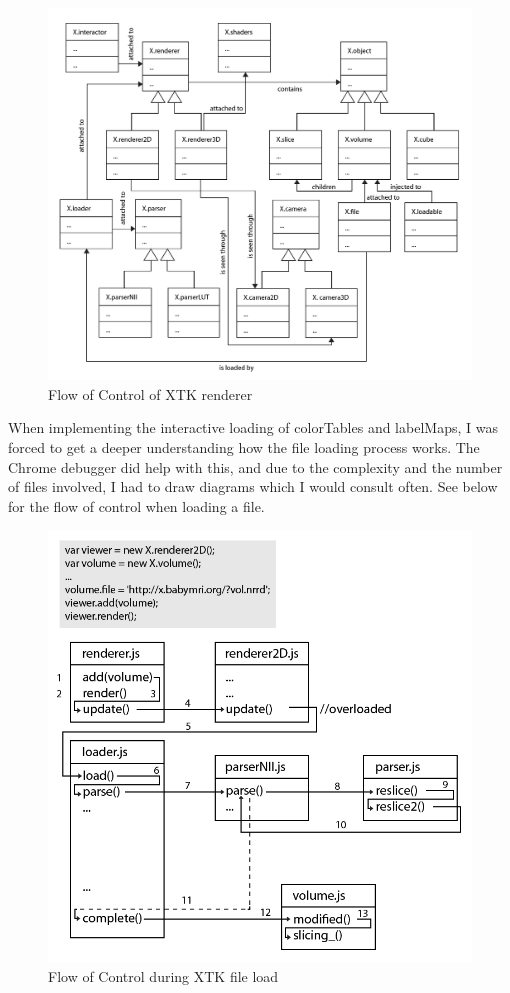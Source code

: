 \documentclass[a4paper,11pt,titlepage]{article}
\begin{document}
\begin{figure}[ht!]
\centering
\includegraphics[width=170mm]{graphics/xtkUML_big_01.png}
\caption{Flow of Control of XTK renderer}
\label{fig:UIdesign1}
\end{figure}



When implementing the interactive loading of colorTables and labelMaps, I was forced to get a deeper understanding how the file loading process works. The Chrome debugger did help with this, and due to the complexity and the number of files involved, I had to draw diagrams which I would consult often. See below for the flow of control when loading a file.

\begin{figure}[ht!]
\centering
\includegraphics[width=140mm]{graphics/XtkFileLoad_01.png}
\caption{Flow of Control during XTK file load}
\label{fig:UIdesign1}
\end{figure}
\end{document}

